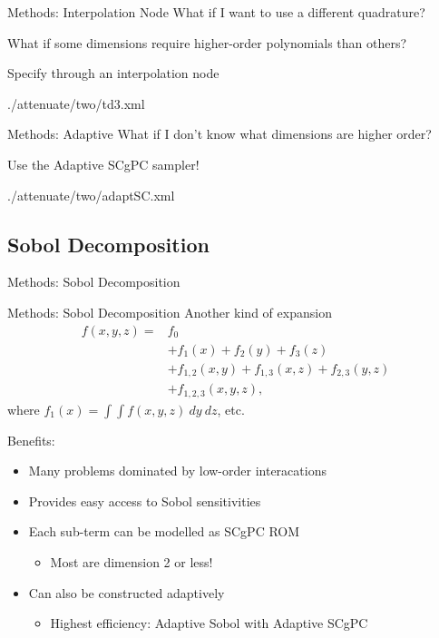 \documentclass[t,9pt,svgnames]{beamer}
\begin{document}
\begin{frame}{Methods: Interpolation Node}
  \vfill
  What if I want to use a different quadrature?
  \vfill

  What if some dimensions require higher-order polynomials than others?
  \vfill

  Specify through an interpolation node
  
          {./attenuate/two/td3.xml}
  \vfill
  
\end{frame}

\begin{frame}{Methods: Adaptive}
  \vfill
  What if I don't know what dimensions are higher order?
  \vfill

  Use the Adaptive SCgPC sampler!
  
          {./attenuate/two/adaptSC.xml}
  \vfill
\end{frame}

\subsection{Sobol Decomposition}
\begin{frame}{Methods: Sobol Decomposition}
\end{frame}

\begin{frame}{Methods: Sobol Decomposition}
  \vfill
  Another kind of expansion
  \begin{align*}
    f(x,y,z) =& f_0 \\
             &+ f_1(x) + f_2(y) + f_3(z)\\
             &+ f_{1,2}(x,y) + f_{1,3}(x,z) + f_{2,3}(y,z) \\
             &+ f_{1,2,3}(x,y,z),
  \end{align*}
  where $f_1(x)=\int\int f(x,y,z)\ dy\ dz$, etc.
  \vfill

  Benefits:
  \vfill
  \begin{itemize}
    \item Many problems dominated by low-order interacations
  \vfill
    \item Provides easy access to Sobol sensitivities
  \vfill
    \item Each sub-term can be modelled as SCgPC ROM
    \begin{itemize}
      \item Most are dimension 2 or less!
    \end{itemize}
  \vfill
    \item Can also be constructed adaptively
    \begin{itemize}
      \item Highest efficiency: Adaptive Sobol with Adaptive SCgPC
    \end{itemize}
  \end{itemize}
  \vfill
\end{frame}
\end{document}
